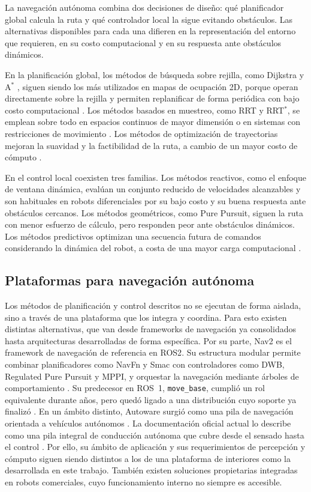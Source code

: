La navegación autónoma combina dos decisiones de diseño: qué planificador
global calcula la ruta y qué controlador local la sigue evitando obstáculos.
Las alternativas disponibles para cada una difieren en la representación
del entorno que requieren, en su costo computacional y en su respuesta ante
obstáculos dinámicos.

En la planificación global, los métodos de búsqueda sobre rejilla, como
Dijkstra y A$^*$ \citep[Sec.~2.2.2]{lavalle2006planning}, siguen siendo los
más utilizados en mapas de ocupación 2D, porque operan directamente sobre la
rejilla y permiten replanificar de forma periódica con bajo costo
computacional \citep{macenski2023desks}. Los métodos basados en muestreo,
como RRT y RRT$^*$, se emplean sobre todo en espacios continuos de mayor
dimensión o en sistemas con restricciones de movimiento
\citep{lavalle2006planning,karaman2011optimal}. Los métodos de optimización de trayectorias
mejoran la suavidad y la factibilidad de la ruta, a cambio de un mayor costo
de cómputo \citep{macenski2023desks}.

En el control local coexisten tres familias. Los métodos reactivos, como el
enfoque de ventana dinámica, evalúan un conjunto reducido de velocidades
alcanzables y son habituales en robots diferenciales por su bajo costo y su
buena respuesta ante obstáculos cercanos. Los métodos geométricos, como Pure
Pursuit, siguen la ruta con menor esfuerzo de cálculo, pero responden peor
ante obstáculos dinámicos. Los métodos predictivos optimizan una secuencia
futura de comandos considerando la dinámica del robot, a costa de una mayor
carga computacional \citep{macenski2023desks}.

\subsection{Plataformas para navegación autónoma}
\label{sec:plataformas_nav}

Los métodos de planificación y control descritos no se ejecutan de forma
aislada, sino a través de una plataforma que los integra y coordina. Para esto
existen distintas alternativas, que van desde frameworks de navegación ya
consolidados hasta arquitecturas desarrolladas de forma específica.
Por su parte, Nav2 es el framework de navegación de referencia en \gls{ROS2}. Su estructura
modular permite combinar planificadores como NavFn y Smac con controladores
como DWB, Regulated Pure Pursuit y MPPI, y orquestar la navegación mediante
árboles de comportamiento \citep{nav2_doc}. Su predecesor en ROS~1,
\texttt{move\_base}, cumplió un rol equivalente durante años, pero quedó ligado
a una distribución cuyo soporte ya finalizó \citep{ros_noetic_eol}. En un
ámbito distinto, Autoware surgió como una pila de navegación orientada a
vehículos autónomos \citep{kato2018autoware}. La documentación oficial actual
lo describe como una pila integral de conducción autónoma que cubre desde el
sensado hasta el control \citep{autoware2026docs}. Por ello, su ámbito de
aplicación y sus requerimientos de percepción y cómputo siguen siendo
distintos a los de una plataforma de interiores como la desarrollada en este
trabajo. También existen soluciones propietarias integradas en robots
comerciales, cuyo funcionamiento interno no siempre es accesible.

